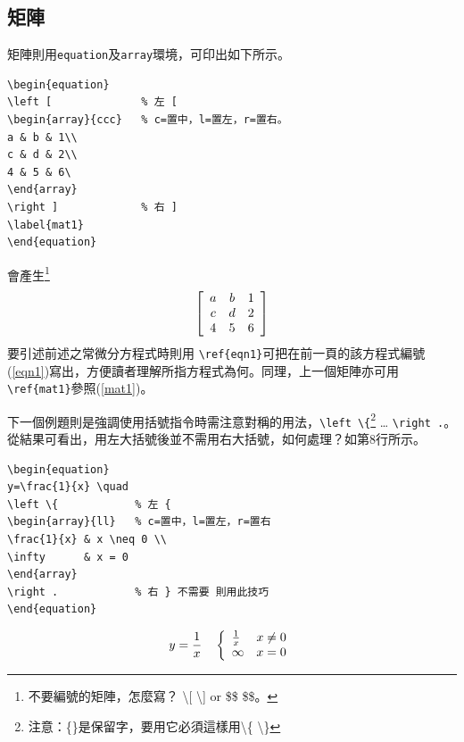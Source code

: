 \subsection{矩陣}
矩陣則用{\tt equation}及{\tt array}環境，可印出如下所示。\\ 
\begin{Verbatim}[frame=single,firstline=1,label=Every matrix]
\begin{equation}
\left [              % 左 [
\begin{array}{ccc}   % c=置中，l=置左，r=置右。
a & b & 1\\
c & d & 2\\
4 & 5 & 6\
\end{array}
\right ]             % 右 ]
\label{mat1}
\end{equation}
\end{Verbatim}
會產生\footnote{不要編號的矩陣，怎麼寫？  \textbackslash [ \textbackslash ] or \$\$ \$\$。} 
\begin{equation}
\left [
\begin{array}{ccc}  \index{\LaTeX\ 環境!array}
a & b & 1\\
c & d & 2\\
4 & 5 & 6
\end{array}
\right ]
\label{mat1} \index{\LaTeX!\textbackslash label}\index{\LaTeX!\textbackslash ref}
\end{equation}
要引述前述之常微分方程式時則用 \verb|\ref{eqn1}|可把在前一頁的該方程式編號(\ref{eqn1})寫出，方便讀者理解所指方程式為何。同理，上一個矩陣亦可用\verb|\ref{mat1}|參照(\ref{mat1})。

下一個例題則是強調使用括號指令時需注意對稱的用法，\verb|\left \{|\footnote{注意：\{\}是保留字，要用它必須這樣用\textbackslash \{ \textbackslash \}} \ldots
\verb|\right .|。從結果可看出，用左大括號後並不需用右大括號，如何處理？如第8行所示。

\begin{Verbatim}[frame=single,firstline=1,label=Pairs]
\begin{equation}
y=\frac{1}{x} \quad  
\left \{            % 左 {
\begin{array}{ll}   % c=置中，l=置左，r=置右
\frac{1}{x} & x \neq 0 \\  
\infty      & x = 0
\end{array}
\right .            % 右 } 不需要 則用此技巧
\end{equation}
\end{Verbatim}
\begin{equation}
y=\frac{1}{x} \quad  \index{\LaTeX!\textbackslash quad}
\left \{
\begin{array}{ll}   
\frac{1}{x} & x \neq 0 \\
\infty      & x = 0  \index{\LaTeX!\textbackslash neq}
\end{array}
\right .            
\end{equation}
